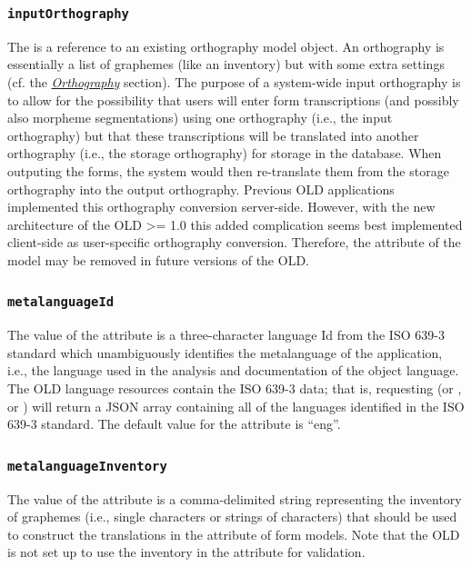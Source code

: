 \documentclass[letterpaper,10pt,english]{sphinxmanual}
\begin{document}
\subsubsection{\texttt{inputOrthography}}
\label{datastructure:inputorthography}
The  is a reference to an existing orthography model object.
An orthography is essentially a list of graphemes (like an inventory) but with
some extra settings (cf. the {\hyperref[datastructure:orthography-data-structure]{\emph{Orthography}}} section).  The
purpose of a system-wide input orthography is to allow for the possibility that
users will enter form transcriptions (and possibly also morpheme segmentations)
using one orthography (i.e., the input orthography) but that these
transcriptions will be translated into another orthography (i.e., the storage
orthography) for storage in the database.  When outputing the forms, the system
would then re-translate them from the storage orthography into the output
orthography.  Previous OLD applications implemented this orthography conversion
server-side.  However, with the new architecture of the OLD \textgreater{}= 1.0 this added
complication seems best implemented client-side as user-specific orthography
conversion.  Therefore, the  attribute of the
 model may be removed in future versions of the OLD.


\subsubsection{\texttt{metalanguageId}}
\label{datastructure:metalanguageid}
The value of the  attribute is a three-character language Id
from the ISO 639-3 standard which unambiguously identifies the metalanguage
of the application, i.e., the language used in the analysis and documentation of
the object language.  The OLD language resources contain the ISO 639-3 data;
that is, requesting  (or ,
 or ) will
return a JSON array containing all of the languages identified in the ISO 639-3
standard.  The default value for the  attribute is ``eng''.


\subsubsection{\texttt{metalanguageInventory}}
\label{datastructure:metalanguageinventory}
The value of the  attribute is a comma-delimited
string representing the inventory of graphemes (i.e., single characters or
strings of characters) that should be used to construct the translations in the
 attribute of form models.  Note that the OLD is not set up to use
the inventory in the  attribute for validation.
\end{document}
